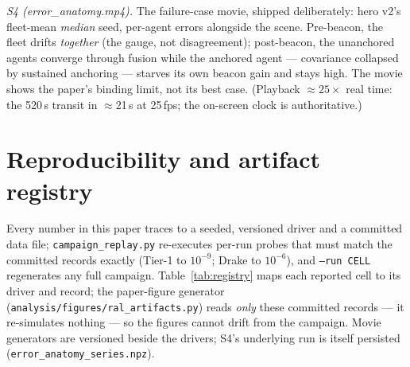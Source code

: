 \documentclass[letterpaper, 10pt, journal]{IEEEtran}
\begin{document}
\emph{S4 (error\_anatomy.mp4).} The failure-case movie, shipped deliberately:
hero v2's fleet-mean \emph{median} seed, per-agent errors alongside the
scene. Pre-beacon, the fleet drifts \emph{together} (the gauge, not
disagreement); post-beacon, the unanchored agents converge through fusion
while the anchored agent --- covariance collapsed by sustained anchoring ---
starves its own beacon gain and stays high. The movie shows the paper's
binding limit, not its best case. (Playback $\approx 25\times$ real time:
the 520\,s transit in $\approx$21\,s at 25\,fps; the on-screen clock is
authoritative.)

\section{Reproducibility and artifact registry}
Every number in this paper traces to a seeded, versioned driver and a committed
data file; \texttt{campaign\_replay.py} re-executes per-run probes that must
match the committed records exactly (Tier-1 to $10^{-9}$; Drake to $10^{-6}$),
and \texttt{--run CELL} regenerates any full campaign.
Table~\ref{tab:registry} maps each reported cell to its driver and record;
the paper-figure generator (\texttt{analysis/figures/ral\_artifacts.py})
reads \emph{only} these committed records --- it re-simulates nothing --- so
the figures cannot drift from the campaign. Movie generators are versioned
beside the drivers; S4's underlying run is itself persisted
(\texttt{error\_anatomy\_series.npz}).
\end{document}
